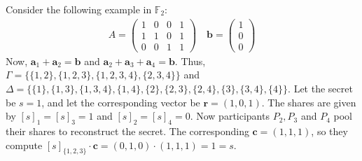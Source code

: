 \documentclass[11pt]{article}
\newcommand{\F}{\mathbb{F}}
\newcommand{\bfa}{\mathbf{a}}
\newcommand{\bfb}{\mathbf{b}}
\newcommand{\bfc}{\mathbf{c}}
\newcommand{\bfr}{\mathbf{r}}
\begin{document}
Consider the following example in $\F_2$:
  \begin{align*}
  A = \left(\begin{array}{cccc} 1 & 0 & 0 & 1 \\ 1 & 1 & 0 & 1 \\ 0 & 0 & 1 & 1 \end{array}\right)\quad \bfb = \left(\begin{array}{c} 1 \\ 0 \\ 0 \end{array}\right)
  \end{align*}
Now, $\bfa_1 + \bfa_2 = \bfb$ and $\bfa_2 + \bfa_3 + \bfa_4 = \bfb$. Thus, $\Gamma = \{\{1,2\},\{1,2,3\},\{1,2,3,4\},\{2,3,4\}\}$ and $\Delta = \{\{1\},\{1,3\},\{1,3,4\},\{1,4\},\{2\},\{2,3\},\{2,4\},\{3\},\{3,4\},\{4\}\}$. Let the secret be $s = 1$, and let the corresponding vector be $\bfr = (1, 0, 1)$. The shares are given by $[s]_1 = [s]_3 = 1$ and $[s]_2 = [s]_4 = 0$. Now participants $P_2,P_3$ and $P_4$ pool their shares to reconstruct the secret. The corresponding $\bfc = (1, 1, 1)$, so they compute $[s]_{\{1,2,3\}}\cdot \bfc = (0,1,0)\cdot(1,1,1) = 1 = s$.
\end{document}
